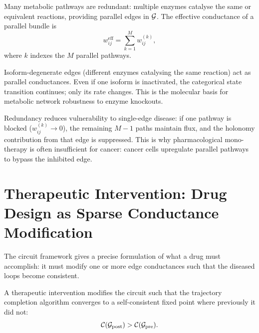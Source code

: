Many metabolic pathways are redundant: multiple enzymes catalyse the same
or equivalent reactions, providing parallel edges in $\mathcal{G}$.  The
effective conductance of a parallel bundle is
\begin{equation}
  w_{ij}^{\mathrm{eff}}
  = \sum_{k=1}^{M} w_{ij}^{(k)},
  \label{eq:parallel-conductance}
\end{equation}
where $k$ indexes the $M$ parallel pathways.

\begin{proposition}
\label{prop:isoform-redundancy}
Isoform-degenerate edges (different enzymes catalysing the same reaction)
act as parallel conductances.  Even if one isoform is inactivated, the
categorical state transition continues; only its rate changes.  This is
the molecular basis for metabolic network robustness to enzyme knockouts.
\end{proposition}

Redundancy reduces vulnerability to single-edge disease: if one pathway
is blocked ($w_{ij}^{(k)} \to 0$), the remaining $M-1$ paths maintain
flux, and the holonomy contribution from that edge is suppressed.  This
is why pharmacological mono-therapy is often insufficient for cancer:
cancer cells upregulate parallel pathways to bypass the inhibited edge.


\section{Therapeutic Intervention: Drug Design as Sparse Conductance Modification}
\label{sec:therapeutic}

The circuit framework gives a precise formulation of what a drug must
accomplish: it must modify one or more edge conductances such that the
diseased loops become consistent.

\begin{definition}
\label{def:therapy}
A therapeutic intervention modifies the circuit such that the trajectory
completion algorithm converges to a self-consistent fixed point where
previously it did not:
\begin{equation}
  \mathcal{C}(\mathcal{G}_{\mathrm{post}}) > \mathcal{C}(\mathcal{G}_{\mathrm{pre}}).
\end{equation}
\end{definition}

